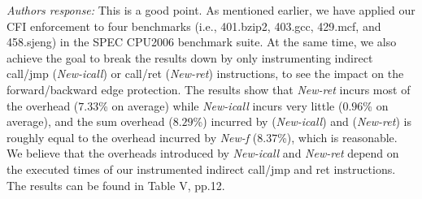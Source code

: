 \documentclass[oneside, 11pt]{article}
\begin{document}
\smallskip
\smallskip
\smallskip
{}

{\em Authors response:}
This is a good point. As mentioned earlier, we have applied our CFI enforcement
to four benchmarks (i.e., 401.bzip2, 403.gcc, 429.mcf, and 458.sjeng) in the
SPEC CPU2006 benchmark suite. At the same time, we also achieve the goal to
break the results down by only instrumenting indirect call/jmp (\emph{New-icall}) or
call/ret (\emph{New-ret}) instructions, to see the impact on the forward/backward
edge protection. The results show that \emph{New-ret} incurs most of the
overhead ($7.33$\% on average) while \emph{New-icall} incurs very little ($0.96$\% on average),
and the sum overhead ($8.29$\%) incurred by (\emph{New-icall}) and (\emph{New-ret}) is
roughly equal to the overhead incurred by \emph{New-f} ($8.37$\%), which is reasonable.
We believe that the overheads introduced by \emph{New-icall} and \emph{New-ret} depend on the
executed times of our instrumented indirect call/jmp and ret instructions.
The results can be found in Table V, pp.12.





\smallskip
\smallskip
\smallskip
{}
\end{document}
